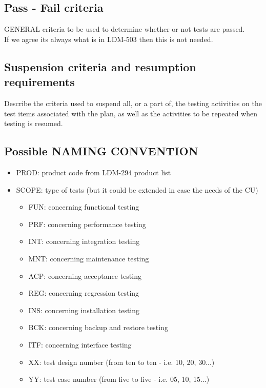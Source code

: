 \documentclass[DM,lsstdraft,STS,toc]{lsstdoc}
\begin{document}
\subsection{Pass - Fail criteria \label{sect:passfail}}
GENERAL criteria to be used to determine whether or not tests are passed.\\
If we agree its always what is in LDM-503 then this is not needed.

\subsection{Suspension criteria and resumption requirements \label{suspension}}
Describe the criteria used to suspend all, or a part of, the testing activities on the test items associated with
the plan, as well as the activities to be repeated when testing is resumed.

\subsection{ Possible  NAMING CONVENTION}
\begin{itemize}
	\item PROD: product code from LDM-294 product list
	\item SCOPE: type of tests (but it could be extended in case the needs of the CU)
\begin{itemize}
	\item	FUN: concerning functional testing
	\item	PRF: concerning performance testing
	\item	INT: concerning integration testing
	\item	MNT: concerning maintenance testing
	\item 	ACP: concerning acceptance testing
	\item	REG: concerning regression testing
	\item	INS: concerning installation testing
	\item	BCK: concerning backup and restore testing
	\item	ITF: concerning interface testing
	\item XX: test design number (from ten to ten - i.e. 10, 20, 30...)
	\item YY: test case number (from five to five - i.e. 05, 10, 15...)
\end{itemize}
\end{itemize}
\end{document}
